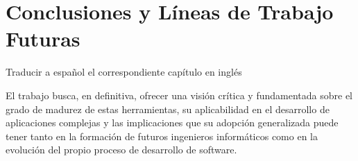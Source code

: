 
\chapter{Conclusiones y Líneas de Trabajo Futuras} \label{chap:Conclusiones} 
Traducir a español el correspondiente capítulo en inglés

El trabajo busca, en definitiva, ofrecer una visión crítica y fundamentada sobre el grado de madurez de estas herramientas, su aplicabilidad en el desarrollo de aplicaciones complejas y las implicaciones que su adopción generalizada puede tener tanto en la formación de futuros ingenieros informáticos como en la evolución del propio proceso de desarrollo de software.